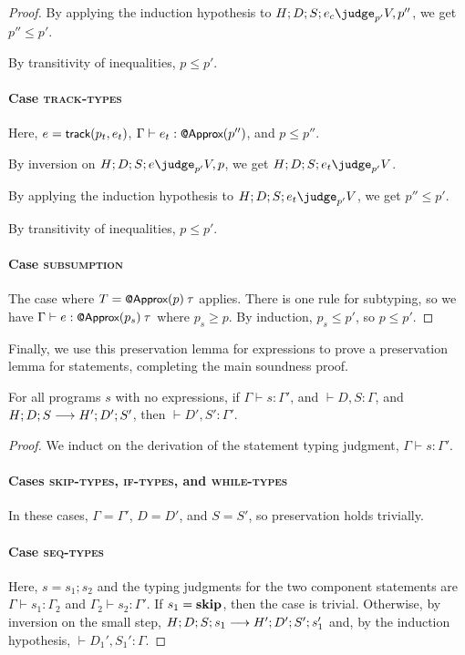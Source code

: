 {\begin{proof}
By applying the induction hypothesis to
$H ; D ; S ; e_c \pjudge{p'} V, p''$, we get $p'' \le p'$.

By transitivity of inequalities, $p \le p'$.

\paragraph{Case \textsc{track-types}}
Here, $e = \text{\normalfont{\sffamily\small{track}}}(p_t, e_t)$,
$\Gamma \vdash e_t : \text{\normalfont{\sffamily\small{@Approx}}}(p'')$,
and $p \le p''$.

By inversion on
$H ; D ; S ; e \pjudge{p'} V, p$, we get
$H ; D ; S ; e_t \pjudge{p'} V$.

By applying the induction hypothesis to
$H ; D ; S ; e_t \pjudge{p'} V$, we get $p'' \le p'$.

By transitivity of inequalities, $p \le p'$.

\paragraph{Case \textsc{subsumption}}
The case where
$T = \text{\normalfont{\sffamily\small{@Approx}}}(p) \> \tau$
applies.
There is one rule for subtyping, so we have
$\Gamma \vdash e : \text{\normalfont{\sffamily\small{@Approx}}}(p_s) \> \tau$
where
$p_s \ge p$.
By induction,
$p_s \le p'$,
so
$p \le p'$.
\end{proof}

Finally, we use this preservation lemma for expressions to prove a
preservation lemma for statements, completing the main soundness proof.

\begin{lemma}
For all programs $s$ with no  expressions,
if $\Gamma \vdash s : \Gamma'$,
and $\vdash D , S : \Gamma$,
and $H ; D ; S \longrightarrow H' ; D' ; S'$,
then
$\vdash D' , S' : \Gamma'$.
\end{lemma}

\begin{proof}
We induct on the derivation of the statement typing judgment,
$\Gamma \vdash s : \Gamma'$.

\paragraph{Cases \textsc{skip-types}, \textsc{if-types}, and
\textsc{while-types}}
    In these cases, $\Gamma = \Gamma'$,
    $D = D'$,
    and $S = S'$,
    so preservation holds trivially.

\paragraph{Case \textsc{seq-types}}
    Here, $s = s_1 ; s_2$ and the typing judgments for the two component
    statements are
    $\Gamma \vdash s_1 : \Gamma_2$
    and
    $\Gamma_2 \vdash s_2 : \Gamma'$.
    If $s_1 = \mathbf{skip}$, then the case is trivial.
    Otherwise, by inversion on the small step,
    $H ; D ; S ; s_1 \longrightarrow
    H' ; D' ; S' ; s_1'$
    and, by the induction hypothesis,
    $\vdash D_1', S_1' : \Gamma$.


\end{proof}}
